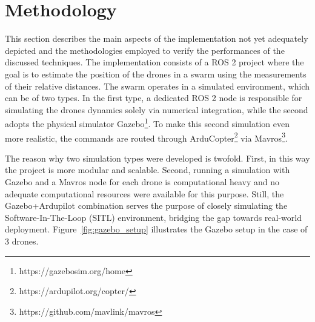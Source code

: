 

\section{Methodology}\label{sec:methodology_section}
This section describes the main aspects of the implementation not yet adequately depicted and the methodologies employed to verify the performances of the discussed techniques.
The implementation consists of a ROS 2 project where the goal is to estimate the position of the drones in a swarm using the measurements of their relative distances. The swarm operates in a simulated environment, which can be of two types. In the first type, a dedicated ROS 2 node is responsible for simulating the drones dynamics solely via numerical integration, while the second adopts the physical simulator Gazebo\footnote{https://gazebosim.org/home}. 
To make this second simulation even more realistic, the commands are routed through ArduCopter\footnote{https://ardupilot.org/copter/} via Mavros\footnote{https://github.com/mavlink/mavros}.

The reason why two simulation types were developed is twofold. First, in this way the project is more modular and scalable. Second, running a simulation with Gazebo and a Mavros node for each drone is computational heavy and no adequate computational resources were available for this purpose. Still, the Gazebo+Ardupilot combination serves the purpose of closely simulating the Software-In-The-Loop (SITL) environment, bridging the gap towards real-world deployment.
Figure~\ref{fig:gazebo_setup} illustrates the Gazebo setup in the case of 3 drones.

